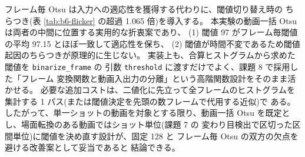フレーム毎 Otsu は入力への適応性を獲得する代わりに、閾値切り替え時の
ちらつき(表 \ref{tab:b6-flicker} の超過 1.065 倍)を導入する。
本実験の動画一括 Otsu は両者の中間に位置する実用的な折衷案であり、
(1) 閾値 97 がフレーム毎閾値の平均 97.15 とほぼ一致して適応性を保ち、
(2) 閾値が時間不変であるため閾値起因のちらつきが原理的に生じない。
実装上も、合算ヒストグラムから求めた閾値を {\tt binarize\_frame} の
引数 {\tt threshold} に渡すだけでよく、課題 8 で採用した「フレーム
変換関数と動画入出力の分離」という高階関数設計をそのまま活かせる。
必要な追加コストは、二値化に先立って全フレームのヒストグラムを
集計する 1 パス(または閾値決定を先頭の数フレームで代用する近似)で
ある。したがって、単一ショットの動画を対象とする限り、動画一括
Otsu を既定とし、場面転換のある動画ではショット単位(課題 7 の
変わり目検出で区切った区間単位)に閾値を決め直す設計が、固定 128 と
フレーム毎 Otsu の双方の欠点を避ける改善案として妥当であると
結論できる。
